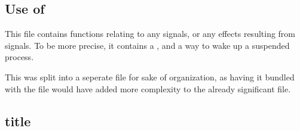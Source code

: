 \documentclass[12pt, a4paper]{report}
\begin{document}
            \subsection{Use of }
                This file contains functions relating to any signals, or any effects
                resulting from signals. To be more precise, it contains a ,
                and a way to wake up a suspended process.

                This was split into a seperate file for sake of organization, as having it
                bundled with the  file would have added more complexity
                to the already significant file.

            \subsection{title}
\end{document}

